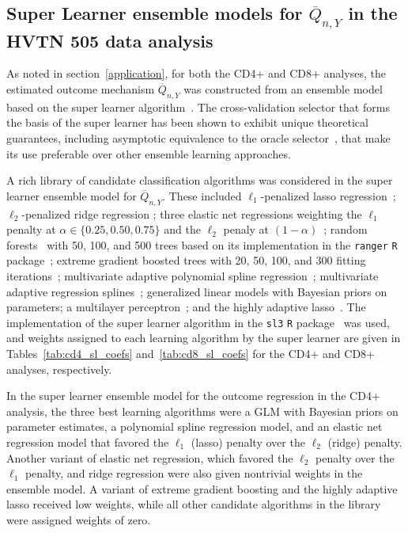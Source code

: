 \subsection{Super Learner ensemble models for $\overline{Q}_{n,Y}$ in the HVTN
  505 data analysis}\label{hvtn_sl_details}

As noted in section~\ref{application}, for both the CD4+ and CD8+ analyses,
the estimated outcome mechanism $\overline{Q}_{n,Y}$ was constructed from an
ensemble model based on the super learner algorithm~\citep{vdl2007super}. The
cross-validation selector that forms the basis of the super learner has been
shown to exhibit unique theoretical guarantees, including asymptotic equivalence
to the oracle selector~\citep{vdl2004asymptotic, vdl2006cross, vdl2006oracle},
that make its use preferable over other ensemble learning approaches.

A rich library of candidate classification algorithms was considered in the
super learner ensemble model for $\overline{Q}_{n,Y}$. These included
$\ell_1$-penalized lasso regression~\citep{tibshirani1996regression,
friedman2009glmnet}; $\ell_2$-penalized ridge regression
\citep{tikhonov1977solutions,hoerl1970ridge,friedman2009glmnet}; three elastic
net regressions weighting the $\ell_1$ penalty at $\alpha \in \{0.25, 0.50,
0.75\}$ and the $\ell_2$ penaly at
$(1-\alpha)$~\citep{zou2003regression,friedman2009glmnet}; random
forests~\citep{breiman2001random} with 50, 100, and 500 trees based on its
implementation in the \texttt{ranger} \texttt{R}
package~\citep{wright2017ranger}; extreme gradient boosted trees with 20, 50,
100, and 300 fitting iterations~\citep{chen2016xgboost}; multivariate adaptive
polynomial spline regression~\citep{kooperberg1997polychotomous,stone1994use};
multivariate adaptive regression splines~\citep{friedman1991multivariate};
generalized linear models with Bayesian priors on parameters; a multilayer
perceptron~\citep{rosenblatt1961principles}; and the highly adaptive
lasso~\citep{vdl2017generally,benkeser2016highly,coyle2019hal9001}. The
implementation of the super learner algorithm in the \texttt{sl3} \texttt{R}
package~\citep{coyle2020sl3} was used, and weights assigned to each learning
algorithm by the super learner are given in Tables~\ref{tab:cd4_sl_coefs}
and~\ref{tab:cd8_sl_coefs} for the CD4+ and CD8+ analyses, respectively.


In the super learner ensemble model for the outcome regression in the CD4+
analysis, the three best learning algorithms were a GLM with Bayesian priors on
parameter estimates, a polynomial spline regression model, and an elastic net
regression model that favored the $\ell_1$ (lasso) penalty over the $\ell_2$
(ridge) penalty. Another variant of elastic net regression, which favored the
$\ell_2$ penalty over the $\ell_1$ penalty, and ridge regression were also given
nontrivial weights in the ensemble model. A variant of extreme gradient boosting
and the highly adaptive lasso received low weights, while all other candidate
algorithms in the library were assigned weights of zero.

